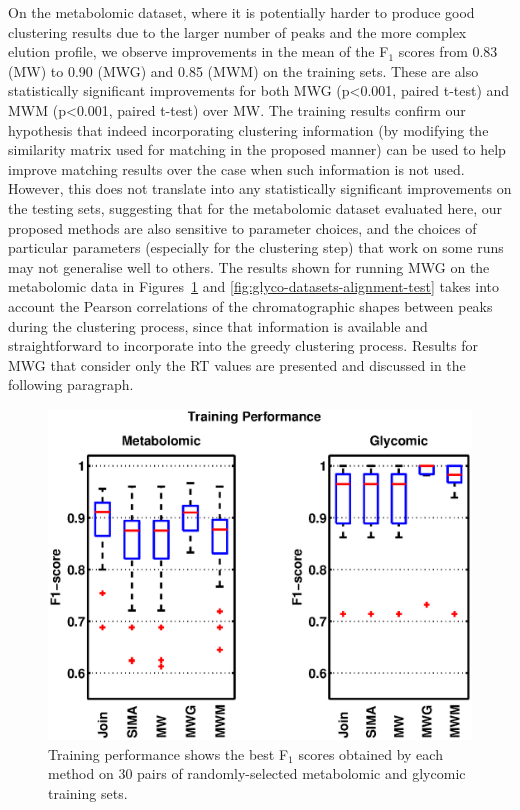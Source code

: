 On the metabolomic dataset, where it is potentially harder to produce good clustering results due to the larger number of peaks and the more complex elution profile, we observe improvements in the mean of the F$_1$ scores from 0.83 (MW) to 0.90 (MWG) and 0.85 (MWM) on the training sets. These are also statistically significant improvements for both MWG (p{\textless}0.001, paired t-test) and MWM (p{\textless}0.001, paired t-test) over MW. The training results confirm our hypothesis that indeed incorporating clustering information (by modifying the similarity matrix used for matching in the proposed manner) can be used to help improve matching results over the case when such information is not used. However, this does not translate into any statistically significant improvements on the testing sets, suggesting that for the metabolomic dataset evaluated here, our proposed methods are also sensitive to parameter choices, and the choices of particular parameters (especially for the clustering step) that work on some runs may not generalise well to others. The results shown for running MWG on the metabolomic data in Figures~\ref{fig:glyco-datasets-alignment-train} and \ref{fig:glyco-datasets-alignment-test} takes into account the Pearson correlations of the chromatographic shapes between peaks during the clustering process, since that information is available and straightforward to incorporate into the greedy clustering process. Results for MWG that consider only the RT values are presented and discussed in the following paragraph. 

\begin{figure}[!htbp]
\centering\includegraphics[width=0.65\columnwidth]{04-matching/figures/figure_3.eps}
\centering\caption{\label{fig:glyco-datasets-alignment-train}Training performance shows the best F$_1$ scores obtained by each method on 30 pairs of randomly-selected metabolomic and glycomic training sets.}
\end{figure}

